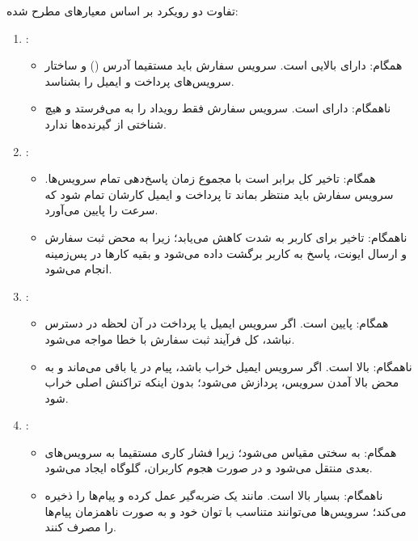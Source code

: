 تفاوت دو رویکرد بر اساس معیارهای مطرح شده:

\begin{enumerate}
    \item {:}
    \begin{itemize}
        \item {همگام:} دارای  بالایی است. سرویس سفارش باید مستقیما آدرس () و ساختار سرویس‌های پرداخت و ایمیل را بشناسد.
        \item {ناهمگام:} دارای  است. سرویس سفارش فقط رویداد را به  می‌فرستد و هیچ شناختی از گیرنده‌ها ندارد.
    \end{itemize}

    \item {:}
    \begin{itemize}
        \item {همگام:} تاخیر کل برابر است با مجموع زمان پاسخ‌دهی تمام سرویس‌ها. سرویس سفارش باید منتظر بماند تا پرداخت و ایمیل کارشان تمام شود که سرعت را پایین می‌آورد.
        \item {ناهمگام:} تاخیر برای کاربر به شدت کاهش می‌یابد؛ زیرا به محض ثبت سفارش و ارسال ایونت، پاسخ به کاربر برگشت داده می‌شود و بقیه کارها در پس‌زمینه انجام می‌شود.
    \end{itemize}

    \item {:}
    \begin{itemize}
        \item {همگام:} پایین است. اگر سرویس ایمیل یا پرداخت در آن لحظه در دسترس نباشد، کل فرآیند ثبت سفارش با خطا مواجه می‌شود.
        \item {ناهمگام:} بالا است. اگر سرویس ایمیل خراب باشد، پیام در  یا  باقی می‌ماند و به محض بالا آمدن سرویس، پردازش می‌شود؛ بدون اینکه تراکنش اصلی خراب شود.
    \end{itemize}

    \item {:}
    \begin{itemize}
        \item {همگام:} به سختی مقیاس می‌شود؛ زیرا فشار کاری مستقیما به سرویس‌های بعدی منتقل می‌شود و در صورت هجوم کاربران، گلوگاه ایجاد می‌شود.
        \item {ناهمگام:} بسیار بالا است.  مانند یک ضربه‌گیر عمل کرده و پیام‌ها را ذخیره می‌کند؛ سرویس‌ها می‌توانند متناسب با توان خود و به صورت ناهمزمان پیام‌ها را مصرف کنند.
    \end{itemize}
\end{enumerate}

